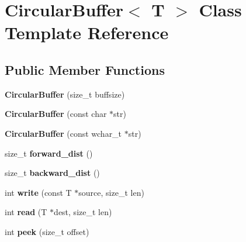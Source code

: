 \hypertarget{class_circular_buffer}{
\section{CircularBuffer$<$ T $>$ Class Template Reference}
\label{class_circular_buffer}
}
\subsection*{Public Member Functions}
\begin{DoxyCompactItemize}
\item 
\hypertarget{class_circular_buffer_acae987ba55f3a56c7872110a58e6dfe4}{
{\bfseries CircularBuffer} (size\_\-t buffsize)}
\label{class_circular_buffer_acae987ba55f3a56c7872110a58e6dfe4}

\item 
\hypertarget{class_circular_buffer_a598d37b9a6d04e9e1429e7744371be45}{
{\bfseries CircularBuffer} (const char $\ast$str)}
\label{class_circular_buffer_a598d37b9a6d04e9e1429e7744371be45}

\item 
\hypertarget{class_circular_buffer_a76fc7f47320d527bdda3cc1e8ffa2bca}{
{\bfseries CircularBuffer} (const wchar\_\-t $\ast$str)}
\label{class_circular_buffer_a76fc7f47320d527bdda3cc1e8ffa2bca}

\item 
\hypertarget{class_circular_buffer_a3a808a9b21f103b9c9fec40be4eefb86}{
size\_\-t {\bfseries forward\_\-dist} ()}
\label{class_circular_buffer_a3a808a9b21f103b9c9fec40be4eefb86}

\item 
\hypertarget{class_circular_buffer_aa583d852e1fce49a98875b5548ca7571}{
size\_\-t {\bfseries backward\_\-dist} ()}
\label{class_circular_buffer_aa583d852e1fce49a98875b5548ca7571}

\item 
\hypertarget{class_circular_buffer_a669d0e8b8c6d5fc1550e90975811430c}{
int {\bfseries write} (const T $\ast$source, size\_\-t len)}
\label{class_circular_buffer_a669d0e8b8c6d5fc1550e90975811430c}

\item 
\hypertarget{class_circular_buffer_a29747e1057928c45f8440a94bc3419c6}{
int {\bfseries read} (T $\ast$dest, size\_\-t len)}
\label{class_circular_buffer_a29747e1057928c45f8440a94bc3419c6}

\item 
\hypertarget{class_circular_buffer_a1e6fb6cc305617ddb8b9976f7463e9d3}{
int {\bfseries peek} (size\_\-t offset)}
\label{class_circular_buffer_a1e6fb6cc305617ddb8b9976f7463e9d3}


\end{DoxyCompactItemize}
